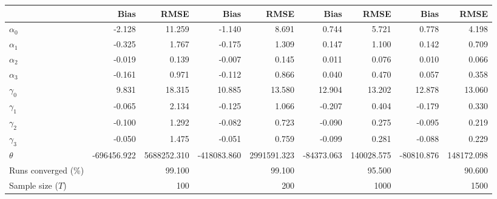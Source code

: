 
\begin{tabular}[t]{lrrrrrrrr}
\toprule
  & Bias & RMSE & Bias & RMSE & Bias & RMSE & Bias & RMSE\\
\midrule
$\alpha_{0}$ & -2.128 & 11.259 & -1.140 & 8.691 & 0.744 & 5.721 & 0.778 & 4.198\\
$\alpha_{1}$ & -0.325 & 1.767 & -0.175 & 1.309 & 0.147 & 1.100 & 0.142 & 0.709\\
$\alpha_{2}$ & -0.019 & 0.139 & -0.007 & 0.145 & 0.011 & 0.076 & 0.010 & 0.066\\
$\alpha_{3}$ & -0.161 & 0.971 & -0.112 & 0.866 & 0.040 & 0.470 & 0.057 & 0.358\\
$\gamma_{0}$ & 9.831 & 18.315 & 10.885 & 13.580 & 12.904 & 13.202 & 12.878 & 13.060\\
$\gamma_{1}$ & -0.065 & 2.134 & -0.125 & 1.066 & -0.207 & 0.404 & -0.179 & 0.330\\
$\gamma_{2}$ & -0.100 & 1.292 & -0.082 & 0.723 & -0.090 & 0.275 & -0.095 & 0.219\\
$\gamma_{3}$ & -0.050 & 1.475 & -0.051 & 0.759 & -0.099 & 0.281 & -0.088 & 0.229\\
$\theta$ & -696456.922 & 5688252.310 & -418083.860 & 2991591.323 & -84373.063 & 140028.575 & -80810.876 & 148172.098\\
Runs converged (\%) &  & 99.100 &  & 99.100 &  & 95.500 &  & 90.600\\
Sample size ($T$) &  & 100 &  & 200 &  & 1000 &  & 1500\\
\bottomrule
\end{tabular}
